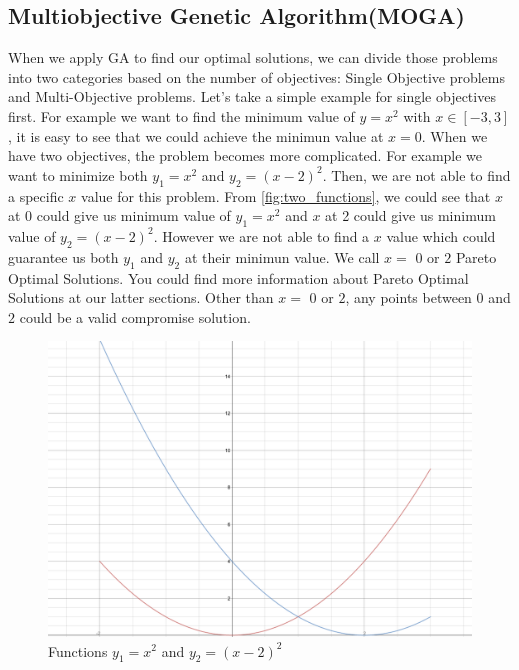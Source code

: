 \subsection{Multiobjective Genetic Algorithm(MOGA)}
When we apply GA to find our optimal solutions, we can divide those problems into two categories based on the number of objectives: Single Objective problems and Multi-Objective problems. Let's take a simple example for single objectives first. For example we want to find the minimum value of \(y=x^2\) with \(x\in [-3,3]\), it is easy to see that we could achieve the minimun value at \(x=0\). When we have two objectives, the problem becomes more complicated. For example we want to minimize both \(y_{1}=x^2\) and \(y_{2}=(x-2)^2\). Then, we are not able to find a specific \(x\) value for this problem. From \autoref{fig:two_functions}, we could see that \(x\) at 0 could give us minimum value of \(y_{1}=x^2\) and \(x\) at 2 could give us minimum value of \(y_{2}=(x-2)^2\). However we are not able to find a \(x\) value which could guarantee us both \(y_{1}\) and \(y_{2}\) at their minimun value. We call \(x=\) \(0\) or \(2\) Pareto Optimal Solutions\cite{Hans_1988_Multicriteria_Pareto_Optimal}\cite{Vira_1983_Multiobjective_Pareto_Optimal}. You could find more information about Pareto Optimal Solutions at our latter sections. Other than \(x=\) \(0\) or \(2\), any points between \(0\) and \(2\) could be a valid compromise solution. 

\begin{figure}[htp] 
\centering
\includegraphics[scale=.2]{images/Figure_1.png}
\caption{Functions \(y_{1}=x^2\) and \(y_{2}=(x-2)^2\)}
\label{fig:two_functions}
\end{figure}

